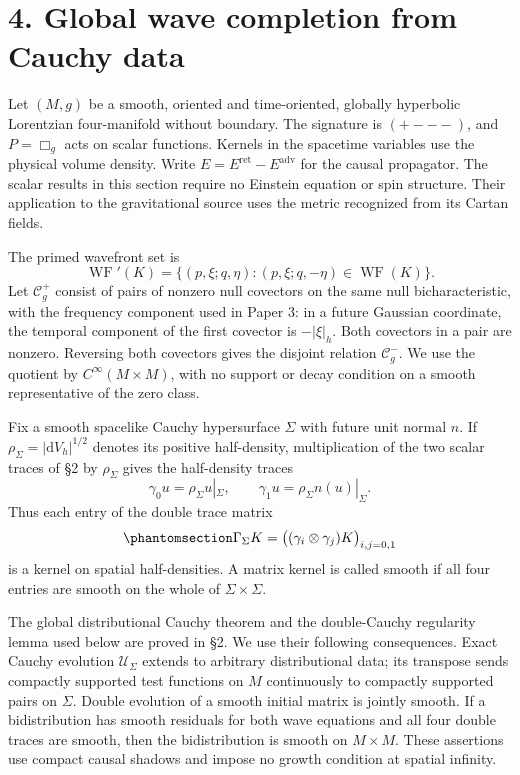 \documentclass[
  english,
  11pt,
  reqno]{amsart}
\begin{document}
\protect{}\label{sec:p4-global-wave-completion}

\section{4. Global wave completion from Cauchy
data}\label{global-wave-completion-from-cauchy-data}

Let \((M,g)\) be a smooth, oriented and time-oriented, globally
hyperbolic Lorentzian four-manifold without boundary. The signature is
\((+---)\), and \(P=\Box_g\) acts on scalar functions. Kernels in the
spacetime variables use the physical volume density. Write
\(E=E^{\mathrm{ret}}-E^{\mathrm{adv}}\) for the causal propagator. The
scalar results in this section require no Einstein equation or spin
structure. Their application to the gravitational source uses the metric
recognized from its Cartan fields.

The primed wavefront set is \[
\operatorname{WF}'(K)=
\{(p,\xi;q,\eta):(p,\xi;q,-\eta)\in\operatorname{WF}(K)\}.
\] Let \(\mathcal C_g^+\) consist of pairs of nonzero null covectors on
the same null bicharacteristic, with the frequency component used in
Paper 3: in a future Gaussian coordinate, the temporal component of the
first covector is \(-|\xi|_h\). Both covectors in a pair are nonzero.
Reversing both covectors gives the disjoint relation \(\mathcal C_g^-\).
We use the quotient by \(C^\infty(M\times M)\), with no support or decay
condition on a smooth representative of the zero class.

Fix a smooth spacelike Cauchy hypersurface \(\Sigma\) with future unit
normal \(n\). If \(\rho_\Sigma=|\mathrm dV_h|^{1/2}\) denotes its
positive half-density, multiplication of the two scalar traces of §2 by
\(\rho_\Sigma\) gives the half-density traces \[
\gamma_0u=\rho_\Sigma u|_\Sigma,
\qquad
\gamma_1u=\rho_\Sigma n(u)|_\Sigma.
\] Thus each entry of the double trace matrix
\begin{equation}\protect\phantomsection\label{eq:p4-double-trace-matrix}{
\Gamma_\Sigma K=
\bigl((\gamma_i\otimes\gamma_j)K\bigr)_{i,j=0,1}
}\end{equation} is a kernel on spatial half-densities. A matrix kernel
is called smooth if all four entries are smooth on the whole of
\(\Sigma\times\Sigma\).

The global distributional Cauchy theorem and the double-Cauchy
regularity lemma used below are proved in §2. We use their following
consequences. Exact Cauchy evolution \(\mathcal U_\Sigma\) extends to
arbitrary distributional data; its transpose sends compactly supported
test functions on \(M\) continuously to compactly supported pairs on
\(\Sigma\). Double evolution of a smooth initial matrix is jointly
smooth. If a bidistribution has smooth residuals for both wave equations
and all four double traces are smooth, then the bidistribution is smooth
on \(M\times M\). These assertions use compact causal shadows and impose
no growth condition at spatial infinity.
\end{document}
